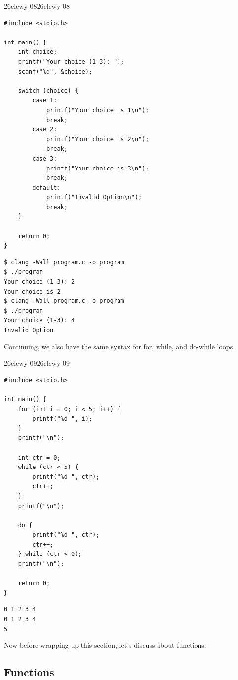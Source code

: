 \documentclass[../../../main.tex]{subfiles}
\begin{document}
\begin{cbox}{26clcwy-08}{26clcwy-08}
\begin{lstlisting}[style=cstyle]
#include <stdio.h>

int main() {
    int choice;
    printf("Your choice (1-3): ");
    scanf("%d", &choice);

    switch (choice) {
        case 1:
            printf("Your choice is 1\n");
            break;
        case 2:
            printf("Your choice is 2\n");
            break;
        case 3:
            printf("Your choice is 3\n");
            break;
        default:
            printf("Invalid Option\n");
            break;
    }

    return 0;
}
\end{lstlisting}
\end{cbox}
\begin{outputbox}
\begin{lstlisting}[style=basic]
$ clang -Wall program.c -o program
$ ./program
Your choice (1-3): 2
Your choice is 2
$ clang -Wall program.c -o program
$ ./program
Your choice (1-3): 4
Invalid Option
\end{lstlisting}
\end{outputbox}

Continuing, we also have the same syntax for for, while, and do-while
loops.

\begin{cbox}{26clcwy-09}{26clcwy-09}
\begin{lstlisting}[style=cstyle]
#include <stdio.h>

int main() {
    for (int i = 0; i < 5; i++) {
        printf("%d ", i);
    }
    printf("\n");

    int ctr = 0;
    while (ctr < 5) {
        printf("%d ", ctr);
        ctr++;
    }
    printf("\n");

    do {
        printf("%d ", ctr);
        ctr++;
    } while (ctr < 0);
    printf("\n");

    return 0;
}
\end{lstlisting}
\end{cbox}
\begin{outputbox}
\begin{lstlisting}[style=basic]
0 1 2 3 4
0 1 2 3 4
5
\end{lstlisting}
\end{outputbox}

Now before wrapping up this section, let's discuss about functions.

\subsection{Functions}
\end{document}
